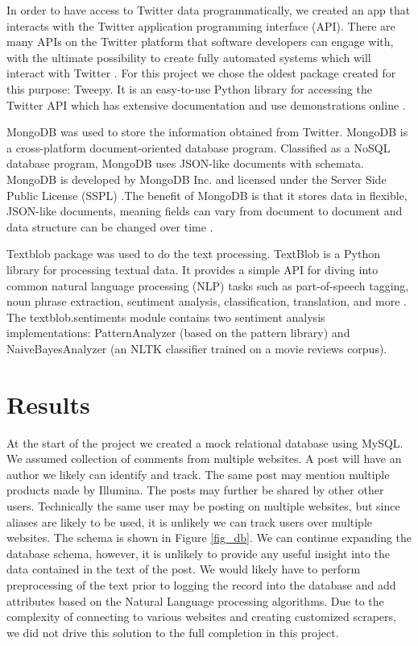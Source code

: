 \documentclass[10pt]{IEEEtran}
\begin{document}
In order to have access to Twitter data programmatically, we created an app that interacts with the Twitter application programming interface (API). There are many APIs on the Twitter platform that software developers can engage with, with the ultimate possibility to create fully automated systems which will interact with Twitter \cite{twitterapi}. For this project we chose the oldest package created for this purpose: Tweepy. It is an easy-to-use Python library for accessing the Twitter API which has extensive documentation and use demonstrations online \cite{tweepy}. 

MongoDB was used to store the information obtained from Twitter. MongoDB is a cross-platform document-oriented database program. Classified as a NoSQL database program, MongoDB uses JSON-like documents with schemata. MongoDB is developed by MongoDB Inc. and licensed under the Server Side Public License (SSPL) \cite{wiki-mongo}.The benefit of MongoDB is that it stores data in flexible, JSON-like documents, meaning fields can vary from document to document and data structure can be changed over time \cite{mongodb}.

Textblob package was used to do the text processing. TextBlob is a Python library for processing textual data. It provides a simple API for diving into common natural language processing (NLP) tasks such as part-of-speech tagging, noun phrase extraction, sentiment analysis, classification, translation, and more \cite{textblob}. The textblob.sentiments module contains two sentiment analysis implementations: PatternAnalyzer (based on the pattern library) and NaiveBayesAnalyzer (an NLTK classifier trained on a movie reviews corpus).




\section{Results}
At the start of the project we created a mock relational database using MySQL. We assumed collection of comments from multiple websites. A post will have an author we likely can identify and track. The same post may mention multiple products made by Illumina. The posts may further be shared by other other users. Technically the same user may be posting on multiple websites, but since aliases are likely to be used, it is unlikely we can track users over multiple websites. The schema is shown in Figure \ref{fig_db}. We can continue expanding the database schema, however, it is unlikely to provide any useful insight into the data contained in the text of the post. We would likely have to perform preprocessing of the text prior to logging the record into the database and add attributes based on the Natural Language processing algorithms. Due to the complexity of connecting to various websites and creating customized scrapers, we did not drive this solution to the full completion in this project. 
\end{document}
